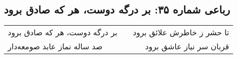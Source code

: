 \begin{center}
\section*{رباعی شماره ۳۵: بر درگه دوست، هر که صادق برود}
\label{sec:035}
\begin{longtable}{l p{0.5cm} r}
بر درگه دوست، هر که صادق برود
&&
تا حشر ز خاطرش علائق برود
\\
صد ساله نماز عابد صومعه‌دار
&&
قربان سر نیاز عاشق برود
\\
\end{longtable}
\end{center}

